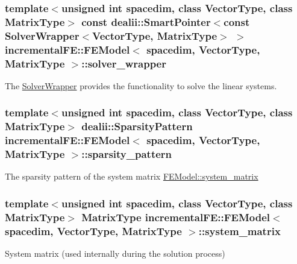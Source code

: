 \subsubsection[{\texorpdfstring{solver\+\_\+wrapper}{solver_wrapper}}]{\setlength{\rightskip}{0pt plus 5cm}template$<$unsigned int spacedim, class Vector\+Type, class Matrix\+Type$>$ const dealii\+::\+Smart\+Pointer$<$const {\bf Solver\+Wrapper}$<${\bf Vector\+Type}, Matrix\+Type$>$ $>$ {\bf incremental\+F\+E\+::\+F\+E\+Model}$<$ spacedim, {\bf Vector\+Type}, Matrix\+Type $>$\+::solver\+\_\+wrapper\hspace{0.3cm}{\ttfamily [private]}}\hypertarget{classincremental_f_e_1_1_f_e_model_a0340e6f1c6949ff2467cd55fb4264575}{}\label{classincremental_f_e_1_1_f_e_model_a0340e6f1c6949ff2467cd55fb4264575}
The \hyperlink{classincremental_f_e_1_1_solver_wrapper}{Solver\+Wrapper} provides the functionality to solve the linear systems. 
\subsubsection[{\texorpdfstring{sparsity\+\_\+pattern}{sparsity_pattern}}]{\setlength{\rightskip}{0pt plus 5cm}template$<$unsigned int spacedim, class Vector\+Type, class Matrix\+Type$>$ dealii\+::\+Sparsity\+Pattern {\bf incremental\+F\+E\+::\+F\+E\+Model}$<$ spacedim, {\bf Vector\+Type}, Matrix\+Type $>$\+::sparsity\+\_\+pattern\hspace{0.3cm}{\ttfamily [private]}}\hypertarget{classincremental_f_e_1_1_f_e_model_aa9415f85bd0dde5e62f4f4047f3d6837}{}\label{classincremental_f_e_1_1_f_e_model_aa9415f85bd0dde5e62f4f4047f3d6837}
The sparsity pattern of the system matrix \hyperlink{classincremental_f_e_1_1_f_e_model_a630cedd2c40193ffe48de47368922aec}{F\+E\+Model\+::system\+\_\+matrix} 
\subsubsection[{\texorpdfstring{system\+\_\+matrix}{system_matrix}}]{\setlength{\rightskip}{0pt plus 5cm}template$<$unsigned int spacedim, class Vector\+Type, class Matrix\+Type$>$ Matrix\+Type {\bf incremental\+F\+E\+::\+F\+E\+Model}$<$ spacedim, {\bf Vector\+Type}, Matrix\+Type $>$\+::system\+\_\+matrix\hspace{0.3cm}{\ttfamily [private]}}\hypertarget{classincremental_f_e_1_1_f_e_model_a630cedd2c40193ffe48de47368922aec}{}\label{classincremental_f_e_1_1_f_e_model_a630cedd2c40193ffe48de47368922aec}
System matrix (used internally during the solution process) 
